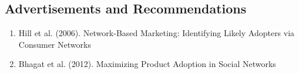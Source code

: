 \subsection{Advertisements and Recommendations}
\begin{enumerate}
\item Hill et al. (2006). Network-Based Marketing: Identifying Likely Adopters via Consumer Networks \cite{Hill_2006}
\item Bhagat et al. (2012). Maximizing Product Adoption in Social Networks\cite{Bhagat:2012:MPA:2124295.2124368}
\end{enumerate}
